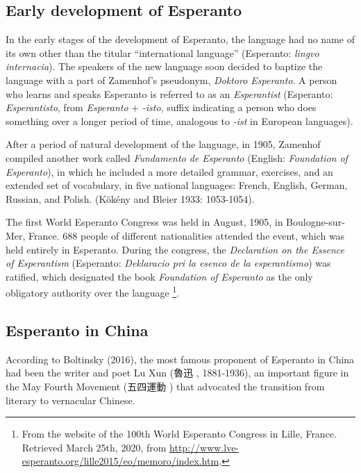 \subsection{Early development of Esperanto}

In the early stages of the development of Esperanto, the language had no name of its own other than the titular ``international language'' (Esperanto: \textit{lingvo internacia}).
The speakers of the new language soon decided to baptize the language with a part of Zamenhof's pseudonym, \textit{Doktoro Esperanto}.
A person who learns and speaks Esperanto is referred to as an \textit{Esperantist} (Esperanto: \textit{Esperantisto}, from \textit{Esperanto} + \textit{-isto}, suffix indicating a person who does something over a longer period of time, analogous to \textit{-ist} in European languages).

After a period of natural development of the language, in 1905, Zamenhof compiled another work called \textit{Fundamento de Esperanto} (English: \textit{Foundation of Esperanto}), in which he included a more detailed grammar, exercises, and an extended set of vocabulary, in five national languages: French, English, German, Russian, and Polish.
(Kökény and Bleier 1933: 1053-1054).

The first World Esperanto Congress was held in August, 1905, in Boulogne-sur-Mer, France.
688 people of different nationalities attended the event, which was held entirely in Esperanto.
During the congress, the \textit{Declaration on the Essence of Esperantism} (Esperanto: \textit{Deklaracio pri la esenco de la esperantismo}) was ratified, which designated the book \textit{Foundation of Esperanto} as the only obligatory authority over the language%
\footnote{From the website of the 100th World Esperanto Congress in Lille, France. Retrieved March 25th, 2020, from \url{http://www.lve-esperanto.org/lille2015/eo/memoro/index.htm}.}.

\subsection{Esperanto in China}
According to Boltinsky (2016), the most famous proponent of Esperanto in China had been the writer and poet Lu Xun (魯迅 , 1881-1936), an important figure in the May Fourth Movement (五四運動 ) that advocated the transition from literary to vernacular Chinese.

